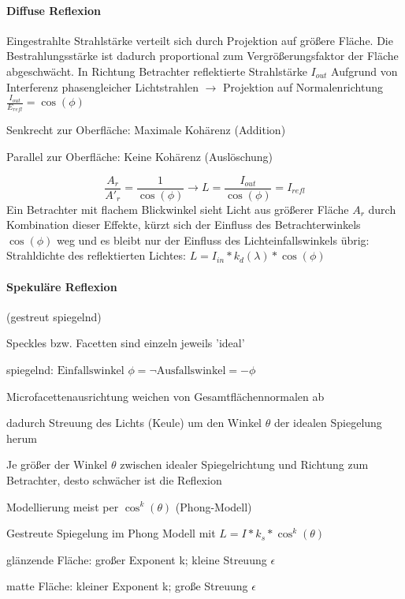 \documentclass[landscape]{article}
\begin{document}
\begin{multicols}{3}
  \paragraph{Diffuse Reflexion}
  Eingestrahlte Strahlstärke verteilt sich durch Projektion auf größere Fläche. Die Bestrahlungsstärke ist dadurch proportional zum Vergrößerungsfaktor der Fläche abgeschwächt.
  In Richtung Betrachter reflektierte Strahlstärke $I_{out}$ Aufgrund von Interferenz phasengleicher Lichtstrahlen $\rightarrow$ Projektion auf Normalenrichtung $\frac{I_{out}}{E_{refl}}=\cos(\phi)$
  \begin{itemize*}
    \item Senkrecht zur Oberfläche: Maximale Kohärenz (Addition)
    \item Parallel zur Oberfläche: Keine Kohärenz (Auslöschung)
  \end{itemize*}
  
  $$\frac{A_r}{A'_r}=\frac{1}{\cos(\phi)} \rightarrow L=\frac{I_{out}}{\cos(\phi)}=I_{refl}$$
  Ein Betrachter mit flachem Blickwinkel sieht Licht aus größerer Fläche $A_r$ durch Kombination dieser Effekte, kürzt sich der Einfluss des Betrachterwinkels $\cos(\phi)$ weg und es bleibt nur der Einfluss des Lichteinfallswinkels übrig: Strahldichte des reflektierten Lichtes: $L=I_{in}*k_d(\lambda)*\cos(\phi)$
  
  \paragraph{Spekuläre Reflexion}
  (gestreut spiegelnd)
  \begin{itemize*}
    \item Speckles bzw. Facetten sind einzeln jeweils 'ideal'
    \item spiegelnd: $\text{Einfallswinkel } \phi = \neg \text{Ausfallswinkel} = -\phi$
    \item Microfacettenausrichtung weichen von Gesamtflächennormalen ab
    \item dadurch Streuung des Lichts (Keule) um den Winkel $\theta$ der idealen Spiegelung herum
    \item Je größer der Winkel $\theta$ zwischen idealer Spiegelrichtung und Richtung zum Betrachter, desto schwächer ist die Reflexion
    \item Modellierung meist per $\cos^k(\theta)$ (Phong-Modell)
  \end{itemize*}
  
  Gestreute Spiegelung im Phong Modell mit $L=I*k_s*\cos^k(\theta)$
  \begin{itemize*}
    \item glänzende Fläche: großer Exponent k; kleine Streuung $\epsilon$
    \item matte Fläche: kleiner Exponent k; große Streuung $\epsilon$
  \end{itemize*}
  

\end{multicols}
\end{document}
